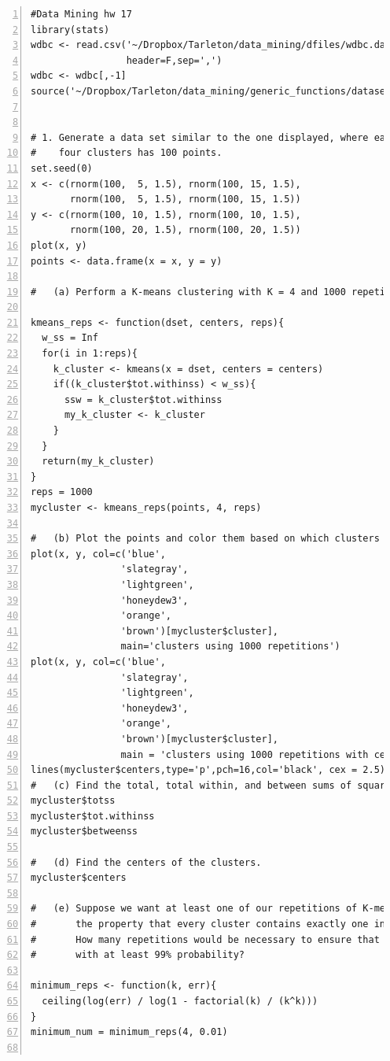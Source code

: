 \documentclass[11pt]{article}
\begin{document}
\begin{Verbatim}[numbers=left]
#Data Mining hw 17
library(stats)
wdbc <- read.csv('~/Dropbox/Tarleton/data_mining/dfiles/wdbc.data',
                 header=F,sep=',')
wdbc <- wdbc[,-1]
source('~/Dropbox/Tarleton/data_mining/generic_functions/dataset_ops.R')


# 1. Generate a data set similar to the one displayed, where each of the 
#    four clusters has 100 points.
set.seed(0)
x <- c(rnorm(100,  5, 1.5), rnorm(100, 15, 1.5), 
       rnorm(100,  5, 1.5), rnorm(100, 15, 1.5))
y <- c(rnorm(100, 10, 1.5), rnorm(100, 10, 1.5), 
       rnorm(100, 20, 1.5), rnorm(100, 20, 1.5))
plot(x, y)
points <- data.frame(x = x, y = y)

#   (a) Perform a K-means clustering with K = 4 and 1000 repetitions.

kmeans_reps <- function(dset, centers, reps){
  w_ss = Inf
  for(i in 1:reps){
    k_cluster <- kmeans(x = dset, centers = centers)
    if((k_cluster$tot.withinss) < w_ss){
      ssw = k_cluster$tot.withinss
      my_k_cluster <- k_cluster
    }
  }
  return(my_k_cluster)
}
reps = 1000
mycluster <- kmeans_reps(points, 4, reps)

#   (b) Plot the points and color them based on which clusters they are in.
plot(x, y, col=c('blue',
                'slategray',
                'lightgreen',
                'honeydew3',
                'orange',
                'brown')[mycluster$cluster],
                main='clusters using 1000 repetitions')
plot(x, y, col=c('blue',
                'slategray',
                'lightgreen',
                'honeydew3',
                'orange',
                'brown')[mycluster$cluster],
                main = 'clusters using 1000 repetitions with centers shown')
lines(mycluster$centers,type='p',pch=16,col='black', cex = 2.5)
#   (c) Find the total, total within, and between sums of squares
mycluster$totss
mycluster$tot.withinss
mycluster$betweenss

#   (d) Find the centers of the clusters. 
mycluster$centers

#   (e) Suppose we want at least one of our repetitions of K-means to have 
#       the property that every cluster contains exactly one initial centroid. 
#       How many repetitions would be necessary to ensure that this happens 
#       with at least 99% probability? 

minimum_reps <- function(k, err){
  ceiling(log(err) / log(1 - factorial(k) / (k^k)))
}
minimum_num = minimum_reps(4, 0.01)


\end{Verbatim}
\end{document}
